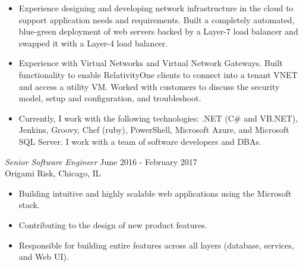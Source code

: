 \documentclass[margin]{res}
\newcommand{\tab}{\hspace*{2em}}
\begin{document}
\begin{resume}
\begin{itemize}
	\item Experience designing and developing network infrastructure in the cloud to support application needs and requirements. Built a completely automated, blue-green deployment of web servers backed by a Layer-7 load balancer and swapped it with a Layer-4 load balancer.
	\item Experience with Virtual Networks and Virtual Network Gateways. Built functionality to enable RelativityOne clients to connect into a tenant VNET and access a utility VM. Worked with customers to discuss the security model, setup and configuration, and troubleshoot.
	\item Currently, I work with the following technologies: .NET (C\# and VB.NET), Jenkins, Groovy, Chef (ruby), PowerShell, Microsoft Azure, and Microsoft SQL Server. I work with a team of software developers and DBAs.
			\end{itemize}

{\sl Senior Software Engineer} \hfill June 2016 - February 2017\\
	Origami Risk, Chicago, IL		\tab	\tab\tab\tab\tab\tab\tab\tab			
	\begin{itemize}  \itemsep -2pt %
	\item Building intuitive and highly scalable web applications using the Microsoft stack.
	\item Contributing to the design of new product features.
	\item Responsible for building entire features across all layers (database, services, and Web UI).
			\end{itemize}


\end{resume}
\end{document}
